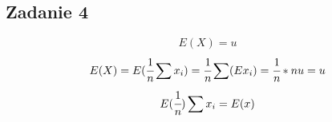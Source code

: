 \subsection{Zadanie 4}
$$
E(X)=u
$$
$$
E(X)=E(\cfrac{1}{n} \sum x_{i})=\cfrac{1}{n} \sum(Ex_{i})=\cfrac{1}{n}*nu=u
$$
$$
E(\cfrac{1}{n}) \sum x_{i}=E(x)
$$
